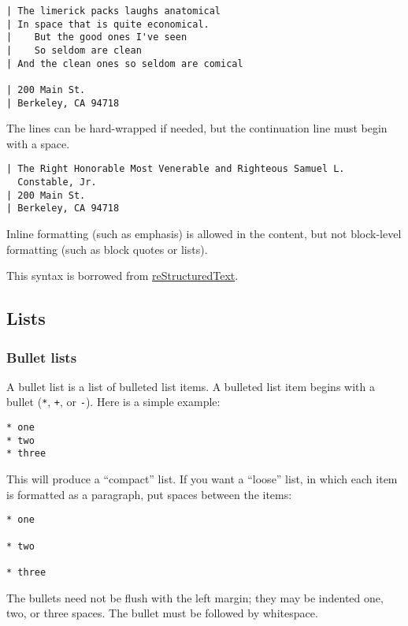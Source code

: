 \documentclass[
]{article}
\begin{document}
\begin{verbatim}
| The limerick packs laughs anatomical
| In space that is quite economical.
|    But the good ones I've seen
|    So seldom are clean
| And the clean ones so seldom are comical

| 200 Main St.
| Berkeley, CA 94718
\end{verbatim}

The lines can be hard-wrapped if needed, but the continuation line must
begin with a space.

\begin{verbatim}
| The Right Honorable Most Venerable and Righteous Samuel L.
  Constable, Jr.
| 200 Main St.
| Berkeley, CA 94718
\end{verbatim}

Inline formatting (such as emphasis) is allowed in the content, but not
block-level formatting (such as block quotes or lists).

This syntax is borrowed from
\href{https://docutils.sourceforge.io/docs/ref/rst/introduction.html}{reStructuredText}.

\hypertarget{lists}{%
\subsection{Lists}\label{lists}}

\hypertarget{bullet-lists}{%
\subsubsection{Bullet lists}\label{bullet-lists}}

A bullet list is a list of bulleted list items. A bulleted list item
begins with a bullet (\texttt{*}, \texttt{+}, or \texttt{-}). Here is a
simple example:

\begin{verbatim}
* one
* two
* three
\end{verbatim}

This will produce a ``compact'' list. If you want a ``loose'' list, in
which each item is formatted as a paragraph, put spaces between the
items:

\begin{verbatim}
* one

* two

* three
\end{verbatim}

The bullets need not be flush with the left margin; they may be indented
one, two, or three spaces. The bullet must be followed by whitespace.
\end{document}

